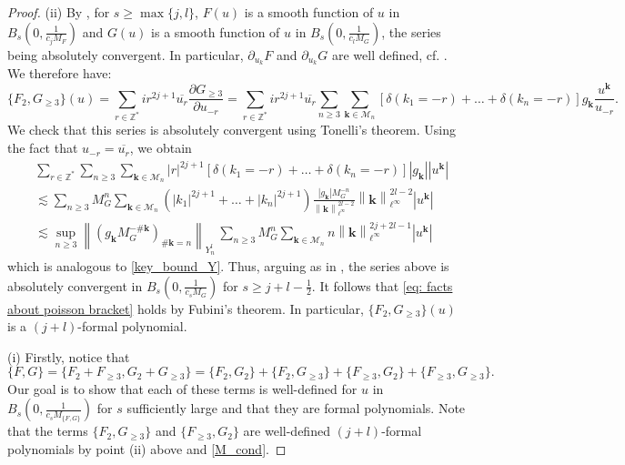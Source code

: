 \documentclass[a4paper,10pt,reqno]{article}
\theoremstyle{definition}
\theoremstyle{plain}
\theoremstyle{plain}
\theoremstyle{definition}
\theoremstyle{plain}
\theoremstyle{plain}
\theoremstyle{plain}
\theoremstyle{definition}
\theoremstyle{definition}
\newcommand{\norm}[1]{\left\lVert #1 \right\rVert}
\def \Z{\mathbb Z}
\def \pa{{\partial}}
\def \M{\mathcal{M}}
\def \k{\bm{k}}
\begin{document}
\begin{proof}
(ii) By , for $s\geq \max\{j,l\}$, $F(u)$ is a smooth function of $u$ in $B_s \left ( 0, \frac{1}{c_j M_F} \right )$ and $G(u)$ is a smooth function of $u$ in $B_s \left ( 0, \frac{1}{c_l M_G} \right )$, the series being absolutely convergent. 
In particular, $\pa_{u_k} F$ and $\pa_{u_k} G$ are well defined, cf. . We therefore have:
\begin{equation} \label{eq:tonelli1}
\{ F_2,G_{\ge 3} \} (u) = \sum_{r \in \Z^*} ir^{2j+1}\overline{u_r} \frac{\pa G_{\ge 3}}{\pa u_{-r}} = \sum_{r \in \Z^*} ir^{2j+1} \overline{u_r} \sum_{n \ge 3} \sum_{\k \in \M_n} \left [ \delta(k_1=-r) + \ldots + \delta(k_n=-r) \right ] g_{\k} \frac{u^{\k}}{u_{-r}}.
\end{equation}
We check that this series is absolutely convergent using Tonelli's theorem.
Using the fact that $u_{-r}=\overline{u_r}$, we obtain
\[
\begin{split}
& \sum_{r \in \Z^*} \sum_{n \ge 3} \sum_{\k \in \M_n}  |r|^{2j+1} \left [ \delta(k_1=-r) + \ldots + \delta(k_n=-r) \right ] |g_{\k}| |u^{\k}| \\
& \lesssim \sum_{n \ge 3} M_G^n \sum_{\k \in \M_n} \left ( |k_1|^{2j+1} + \ldots + |k_n|^{2j+1} \right ) \frac{|g_{\k}|M_G^{-n}}{\norm{\k}_{\ell^{\infty}}^{2l-2}} \norm{\k}_{\ell^{\infty}}^{2l-2} |u^{\k}| \\
& \lesssim \sup_{n \ge 3} \norm{ (g_{\k} M_G^{-\#{\k}})_{\#{\k} = n} }_{Y_n^l} \,\sum_{n \ge 3} M_G^n \sum_{\k \in \M_n} n \norm{\k}_{\ell^{\infty}}^{2j+2l-1} |u^{\k}|
\end{split}
\]
which is analogous to \eqref{key_bound_Y}. Thus, arguing as in , the series above is absolutely convergent in $B_s(0,\frac{1}{c_s M_G})$ for $s \ge j+l-\frac{1}{2}.$
It follows that \eqref{eq: facts about poisson bracket} holds by Fubini's theorem.  In particular, $\{ F_2,G_{\ge 3} \} (u)$ is a $(j+l)$-formal polynomial. 

\medskip

\noindent (i) Firstly, notice that
\begin{equation}\label{eq:PoissonFG}
\{ F,G \} = \{ F_2+F_{\ge 3} , G_2+G_{\ge 3} \} = \{ F_2,G_2 \} + \{ F_2,G_{\ge 3} \} + \{ F_{\ge 3},G_2 \} + \{ F_{\ge 3},G_{\ge 3} \}. 
\end{equation}
Our goal is to show that each of these terms is well-defined for $u$ in $B_s \left ( 0, \frac{1}{c_s M_{\{F,G \}}} \right )$ for $s$ sufficiently large and that they are formal polynomials. Note that the terms $\{ F_2,G_{\ge 3} \}$ and $\{ F_{\ge 3},G_2 \}$ are well-defined $(j+l)$-formal polynomials by point (ii) above and \eqref{M_cond}.


\end{proof}
\end{document}
